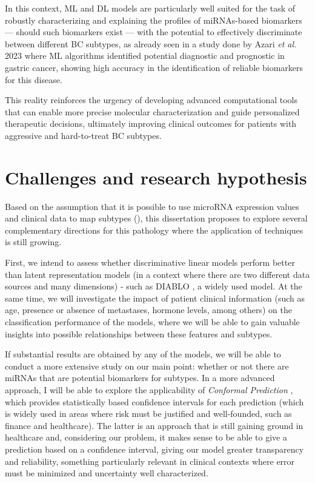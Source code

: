 In this context, \gls{ML} and \gls{DL} models are particularly well suited for
the task of robustly characterizing and explaining the profiles of
\gls{miRNAs}-based biomarkers — should such biomarkers exist — with the
potential to effectively discriminate between different \gls{BC} subtypes, as
already seen in a study done by \textcite{ml_gastric_Azari2023} Azari
\textit{et al.} 2023 where \gls{ML} algorithms identified potential diagnostic
and prognostic  in gastric cancer, showing high accuracy in
the identification of reliable biomarkers for this disease.

This reality reinforces the urgency of developing advanced computational tools
that can enable more precise molecular characterization and guide personalized
therapeutic decisions, ultimately improving clinical outcomes for patients with
aggressive and hard-to-treat \gls{BC} subtypes.

\section{Challenges and research hypothesis}
\label{sec:challenges+research-hypothesis}
Based on the assumption that it is possible to use microRNA expression values
and clinical data to map  subtypes
(\textcites{mirna_as_biomarkers_Ho2022}{mirnas_in_bc_Muñoz2023}), this dissertation
proposes to explore several complementary directions for this pathology where
the application of  techniques is still growing.

First, we intend to assess whether discriminative linear models perform better
than latent representation models (in a context where there are two different
data sources and many dimensions) - such as DIABLO \textcite{DIABLO_Singh2019},
a widely used model. At the same time, we will investigate the impact of
patient clinical information (such as age, presence or absence of metastases,
hormone levels, among others) on the classification performance of the models,
where we will be able to gain valuable insights into possible relationships
between these features and  subtypes.

If substantial results are obtained by any of the models, we will be able to
conduct a more extensive study on our main point: whether or not there are
\gls{miRNAs} that are potential biomarkers for  subtypes. In a
more advanced approach, I will be able to explore the applicability of
\textit{Conformal Prediction} \textcite{conformal_prediction_Angelopoulos2023},
which provides statistically based confidence intervals for each prediction
(which is widely used in areas where risk must be justified and well-founded,
such as finance and healthcare). The latter is an approach that is still
gaining ground in healthcare and, considering our problem, it makes sense to be
able to give a prediction based on a confidence interval, giving our model
greater transparency and reliability, something particularly relevant in
clinical contexts where error must be minimized and uncertainty well
characterized.

